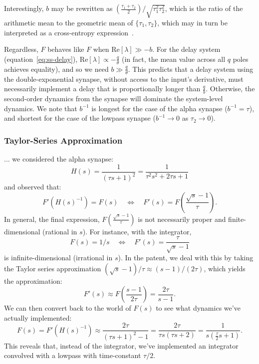 Interestingly, $b$ may be rewritten as $\left( \frac{ \tau_1 + \tau_2}{2} \right) / \sqrt{\tau_1^2 \tau_2^2}$, which is the ratio of the arithmetic mean to the geometric mean of $\{\tau_1, \tau_2\}$, which may in turn be interpreted as a cross-entropy expression~\citep{woodhouse2001ratio}.

Regardless, $\hat{F}$ behaves like $F$ when $\text{Re} \left[ \lambda \right] \gg -b$.
For the delay system (equation~\ref{eq:ss-delay}), $\text{Re} \left[ \lambda \right] \propto -\frac{q}{\theta}$ (in fact, the mean value across all $q$ poles achieves equality), and so we need $b \gg \frac{q}{\theta}$.
This predicts that a delay system using the double-exponential synapse, without access to the input's derivative, must necessarily implement a delay that is proportionally longer than $\frac{q}{b}$.
Otherwise, the second-order dynamics from the synapse will dominate the system-level dynamics.
We note that $b^{-1}$ is longest for the case of the alpha synapse ($b^{-1} = \tau$), and shortest for the case of the lowpass synapse ($b^{-1} \rightarrow 0$ as $\tau_2 \rightarrow 0$).



\subsubsection{Taylor-Series Approximation}

...
we considered the alpha synapse:
$$H(s) = \frac{1}{(\tau s + 1)^2} = \frac{1}{\tau^2 s^2 + 2\tau s + 1}$$
and observed that:
$$F' \left( H(s)^{-1} \right) = F(s) \quad \iff \quad F'(s) = F \left( \frac{\sqrt{s} - 1}{\tau} \right) .$$
In general, the final expression, $F \left( \frac{\sqrt{s} - 1}{\tau} \right)$ is not necessarily proper and finite-dimensional (rational in $s$). For instance, with the integrator,
$$F(s) = 1/s \quad \iff \quad F'(s) = \frac{\tau}{\sqrt{s} - 1}$$
is infinite-dimensional (irrational in $s$).
In the patent, we deal with this by taking the Taylor series approximation $(\sqrt{s} - 1) / \tau \approx \left( s - 1 \right) / (2 \tau)$, which yields the approximation: $$F'(s) \approx F \left( \frac{s-1}{2\tau} \right) = \frac{2 \tau}{s - 1} .$$
We can then convert back to the world of $F(s)$ to see what dynamics we've actually implemented:
$$F(s) = F' \left( H(s)^{-1} \right) \approx \frac{2\tau}{(\tau s + 1)^2 - 1} = \frac{2\tau}{\tau s (\tau s + 2)} = \frac{1}{s \left( \frac{\tau}{2} s + 1 \right) } .$$
This reveals that, instead of the integrator, we've implemented an integrator convolved with a lowpass with time-constant $\tau / 2$.

